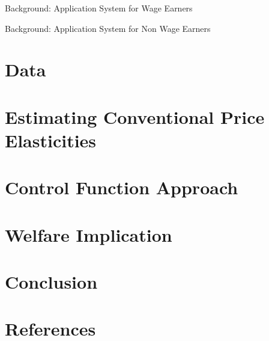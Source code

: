\documentclass[
  ignorenonframetext,
  aspectratio=169,
]{beamer}
\begin{document}
\begin{frame}{Background: Application System for Wage Earners}
\protect\hypertarget{background-application-system-for-wage-earners}{}
\end{frame}

\begin{frame}{Background: Application System for Non Wage Earners}
\protect\hypertarget{background-application-system-for-non-wage-earners}{}
\end{frame}

\hypertarget{data}{%
\section{Data}\label{data}}

\hypertarget{estimating-conventional-price-elasticities}{%
\section{Estimating Conventional Price Elasticities}\label{estimating-conventional-price-elasticities}}

\hypertarget{control-function-approach}{%
\section{Control Function Approach}\label{control-function-approach}}

\hypertarget{welfare-implication}{%
\section{Welfare Implication}\label{welfare-implication}}

\hypertarget{conclusion}{%
\section{Conclusion}\label{conclusion}}

\hypertarget{references}{%
\section*{References}\label{references}}
\end{document}
